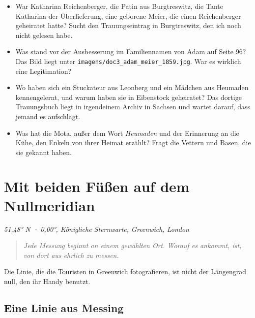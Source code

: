 \documentclass[
  ngerman,
  11pt,
  openany]{book}
\providecommand{\tightlist}{%
  \setlength{\itemsep}{0pt}\setlength{\parskip}{0pt}}
\begin{document}
\begin{itemize}
\tightlist
\item
  War Katharina Reichenberger, die Patin aus Burgtreswitz, die Tante
  Katharina der Überlieferung, eine geborene Meier, die einen
  Reichenberger geheiratet hatte? Sucht den Trauungseintrag in
  Burgtreswitz, den ich noch nicht gelesen habe.
\item
  Was stand vor der Ausbesserung im Familiennamen von Adam auf Seite 96?
  Das Bild liegt unter \texttt{imagens/doc3\_adam\_meier\_1859.jpg}. War
  es wirklich eine Legitimation?
\item
  Wo haben sich ein Stuckateur aus Leonberg und ein Mädchen aus Heumaden
  kennengelernt, und warum haben sie in Eibenstock geheiratet? Das
  dortige Trauungsbuch liegt in irgendeinem Archiv in Sachsen und wartet
  darauf, dass jemand es aufschlägt.
\item
  Was hat die Mota, außer dem Wort \emph{Heumaden} und der Erinnerung an
  die Kühe, den Enkeln von ihrer Heimat erzählt? Fragt die Vettern und
  Basen, die sie gekannt haben.
\end{itemize}

\chapter{Mit beiden Füßen auf dem Nullmeridian}\label{cap-19}

\emph{51,48° N · 0,00°, Königliche Sternwarte, Greenwich, London}

\begin{quote}
\emph{Jede Messung beginnt an einem gewählten Ort. Worauf es ankommt,
ist, von dort aus ehrlich zu messen.}
\end{quote}

Die Linie, die die Touristen in Greenwich fotografieren, ist nicht der
Längengrad null, den ihr Handy benutzt.

\section{Eine Linie aus Messing}\label{eine-linie-aus-messing}
\end{document}

